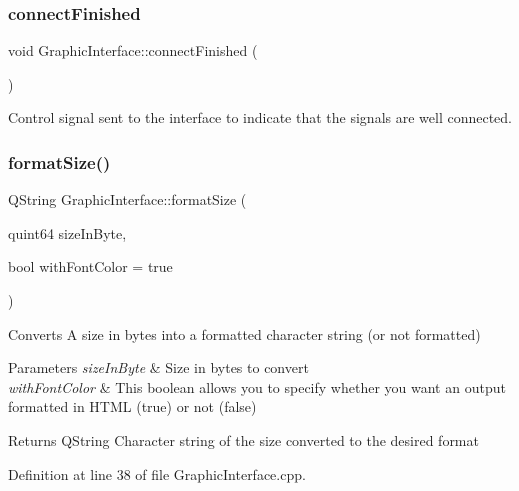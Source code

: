 \subsubsection{\texorpdfstring{connect\+Finished}{connectFinished}}
{\footnotesize\ttfamily void Graphic\+Interface\+::connect\+Finished (\begin{DoxyParamCaption}{ }\end{DoxyParamCaption})\hspace{0.3cm}{\ttfamily [signal]}}



Control signal sent to the interface to indicate that the signals are well connected. 

\mbox{\label{class_graphic_interface_a8fb9de69c45da9b0e20c643dc84e15fa}} 
\subsubsection{\texorpdfstring{format\+Size()}{formatSize()}}
{\footnotesize\ttfamily Q\+String Graphic\+Interface\+::format\+Size (\begin{DoxyParamCaption}\item[{quint64}]{size\+In\+Byte,  }\item[{bool}]{with\+Font\+Color = {\ttfamily true} }\end{DoxyParamCaption})\hspace{0.3cm}{\ttfamily [static]}}



Converts A size in bytes into a formatted character string (or not formatted) 


\begin{DoxyParams}{Parameters}
{\em size\+In\+Byte} & Size in bytes to convert \\
\hline
{\em with\+Font\+Color} & This boolean allows you to specify whether you want an output formatted in H\+T\+ML (true) or not (false) \\
\hline
\end{DoxyParams}
\begin{DoxyReturn}{Returns}
Q\+String Character string of the size converted to the desired format 
\end{DoxyReturn}


Definition at line 38 of file Graphic\+Interface.\+cpp.

